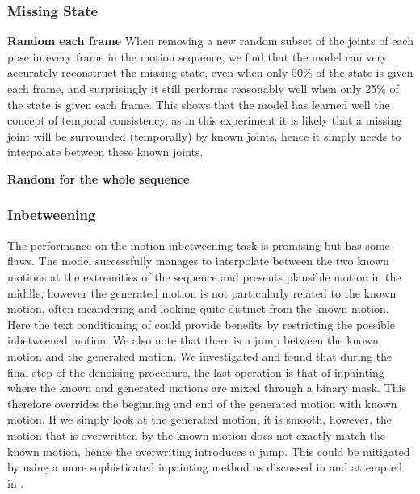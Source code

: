 \subsubsection{Missing State}
\textbf{Random each frame}
When removing a new random subset of the joints of each pose in every frame in the motion sequence, we find that the model can very accurately reconstruct the missing state, even when only 50\% of the state is given each frame, and surprisingly it still performs reasonably well when only 25\% of the state is given each frame. This shows that the model has learned well the concept of temporal consistency, as in this experiment it is likely that a missing joint will be surrounded (temporally) by known joints, hence it simply needs to interpolate between these known joints.


\textbf{Random for the whole sequence}


\subsubsection{Inbetweening}
\label{sec:diffusion_baseline_inbetweening}

The performance on the motion inbetweening task is promising but has some flaws. The model successfully manages to interpolate between the two known motions at the extremities of the sequence and presents plausible motion in the middle, however the generated motion is not particularly related to the known motion, often meandering and looking quite distinct from the known motion. Here the text conditioning of \cite{MDM} could provide benefits by restricting the possible inbetweened motion. We also note that there is a jump between the known motion and the generated motion. We investigated and found that during the final step of the denoising procedure, the last operation is that of inpainting where the known and generated motions are mixed through a binary mask. This therefore overrides the beginning and end of the generated motion with known motion. If we simply look at the generated motion, it is smooth, however, the motion that is overwritten by the known motion does not exactly match the known motion, hence the overwriting introduces a jump. This could be mitigated by using a more sophisticated inpainting method as discussed in  and attempted in .


